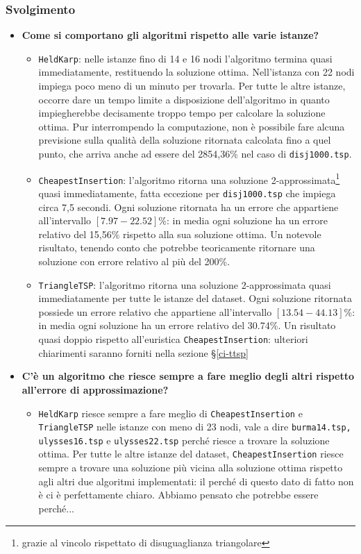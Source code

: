 \subsubsection{Svolgimento}
\begin{itemize}
	\item \textbf{Come si comportano gli algoritmi rispetto alle varie istanze?}
	\begin{itemize}
		\item \texttt{HeldKarp}: nelle istanze fino di 14 e 16 nodi l'algoritmo termina quasi immediatamente, restituendo la soluzione ottima. Nell'istanza con 22 nodi impiega poco meno di un minuto per trovarla. Per tutte le altre istanze, occorre dare un tempo limite a disposizione dell'algoritmo in quanto impiegherebbe decisamente troppo tempo per calcolare la soluzione ottima. Pur interrompendo la computazione, non è possibile fare alcuna previsione sulla qualità della soluzione ritornata calcolata fino a quel punto, che arriva anche ad essere del 2854,36\% nel caso di \texttt{disj1000.tsp}.
		\item \texttt{CheapestInsertion}: l'algoritmo ritorna una soluzione 2-approssimata\footnote{grazie al vincolo rispettato di disuguaglianza triangolare} quasi immediatamente, fatta eccezione per \texttt{disj1000.tsp} che impiega circa 7,5 secondi. Ogni soluzione ritornata ha un errore che appartiene all'intervallo $[7.97 - 22.52]$\%: in media ogni soluzione ha un errore relativo del 15,56\% rispetto alla sua soluzione ottima. Un notevole risultato, tenendo conto che potrebbe teoricamente ritornare una soluzione con errore relativo al più del 200\%.
		\item \texttt{TriangleTSP}: l'algoritmo ritorna una soluzione 2-approssimata quasi immediatamente per tutte le istanze del dataset. Ogni soluzione ritornata possiede un errore relativo che appartiene all'intervallo $[13.54 - 44.13]$\%: in media ogni soluzione ha un errore relativo del 30.74\%. Un risultato quasi doppio rispetto all'euristica \texttt{CheapestInsertion}: ulteriori chiarimenti saranno forniti nella sezione \S\ref{ci-ttsp}
	\end{itemize}
	\item \textbf{C'è un algoritmo che riesce sempre a fare meglio degli altri rispetto all'errore di approssimazione?}
	\begin{itemize}
		\item \texttt{HeldKarp} riesce sempre a fare meglio di \texttt{CheapestInsertion} e \texttt{TriangleTSP} nelle istanze con meno di 23 nodi, vale a dire \texttt{burma14.tsp, ulysses16.tsp} e \texttt{ulysses22.tsp} perché riesce a trovare la soluzione ottima. Per tutte le altre istanze del dataset, \texttt{CheapestInsertion} riesce sempre a trovare una soluzione più vicina alla soluzione ottima rispetto agli altri due algoritmi implementati: il perché di questo dato di fatto non è ci è perfettamente chiaro. Abbiamo pensato che potrebbe essere perché... %

\end{itemize}
\end{itemize}
